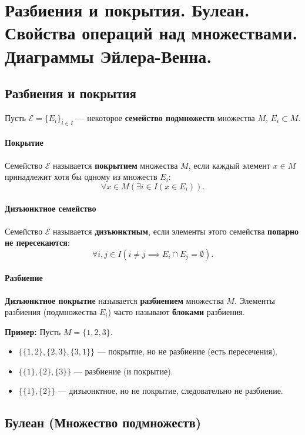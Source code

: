 \section{Разбиения и покрытия. Булеан. Свойства операций над множествами. Диаграммы Эйлера-Венна.}

\subsection*{Разбиения и покрытия}

Пусть $\mathcal{E} = \{E_i\}_{i \in I}$ --- некоторое \textbf{семейство подмножеств} множества $M$, $E_i \subset M$.

\paragraph{Покрытие}
Семейство $\mathcal{E}$ называется \textbf{покрытием} множества $M$, если каждый элемент $x \in M$ принадлежит хотя бы одному из множеств $E_i$:
$$\forall x \in M (\exists i \in I (x \in E_i)).$$

\paragraph{Дизъюнктное семейство}
Семейство $\mathcal{E}$ называется \textbf{дизъюнктным}, если элементы этого семейства \textbf{попарно не пересекаются}:
$$\forall i, j \in I (i \ne j \implies E_i \cap E_j = \emptyset).$$

\paragraph{Разбиение}
\textbf{Дизъюнктное покрытие} называется \textbf{разбиением} множества $M$. Элементы разбиения (подмножества $E_i$) часто называют \textbf{блоками} разбиения.

\textbf{Пример:} Пусть $M = \{1, 2, 3\}$.
\begin{itemize}
    \item $\{\{1, 2\}, \{2, 3\}, \{3, 1\}\}$ --- покрытие, но не разбиение (есть пересечения).
    \item $\{\{1\}, \{2\}, \{3\}\}$ --- разбиение (и покрытие).
    \item $\{\{1\}, \{2\}\}$ --- дизъюнктное, но не покрытие, следовательно не разбиение.
\end{itemize}

\subsection*{Булеан (Множество подмножеств)}

